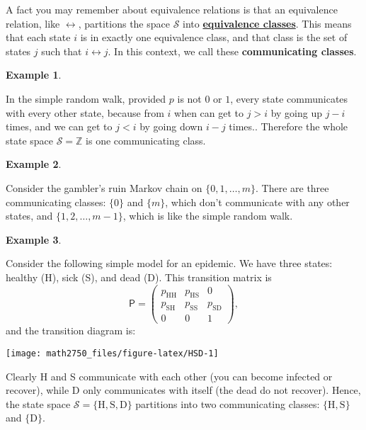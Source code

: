 \documentclass[
  a4paper,
]{article}
\theoremstyle{definition}
\theoremstyle{definition}
\newtheorem{example}{Example}[section]
\theoremstyle{definition}
\theoremstyle{remark}
\begin{document}
A fact you may remember about equivalence relations is that an equivalence relation, like \(\leftrightarrow\), partitions the space \(\mathcal S\) into \href{https://en.wikipedia.org/wiki/Equivalence_class}{\textbf{equivalence classes}}. This means that each state \(i\) is in exactly one equivalence class, and that class is the set of states \(j\) such that \(i \leftrightarrow j\). In this context, we call these \textbf{communicating classes}.

\begin{example}
\protect\hypertarget{exm:rw-class}{}\label{exm:rw-class}

In the simple random walk, provided \(p\) is not \(0\) or \(1\), every state communicates with every other state, because from \(i\) when can get to \(j > i\) by going up \(j - i\) times, and we can get to \(j < i\) by going down \(i - j\) times.. Therefore the whole state space \(\mathcal S = \mathbb Z\) is one communicating class.

\end{example}

\begin{example}
\protect\hypertarget{exm:gamblers-class}{}\label{exm:gamblers-class}

Consider the gambler's ruin Markov chain on \(\{0,1,\dots,m\}\). There are three communicating classes: \(\{0\}\) and \(\{m\}\), which don't communicate with any other states, and \(\{1,2,\dots,m-1\}\), which is like the simple random walk.

\end{example}

\begin{example}
\protect\hypertarget{exm:hsd-class}{}\label{exm:hsd-class}

Consider the following simple model for an epidemic. We have three states: healthy (H), sick (S), and dead (D). This transition matrix is
\[ \mathsf P = \begin{pmatrix} p_{\mathrm{HH}} & p_{\mathrm{HS}} & 0 \\
p_{\mathrm{SH}} & p_{\mathrm{SS}} & p_{\mathrm{SD}} \\ 0 & 0 & 1 \end{pmatrix} ,    \]
and the transition diagram is:

\begin{center}\texttt{[image: math2750\_files/figure-latex/HSD-1]} \end{center}

Clearly H and S communicate with each other (you can become infected or recover), while D only communicates with itself (the dead do not recover). Hence, the state space \(\mathcal S = \{\mathrm{H},\mathrm{S},\mathrm{D}\}\) partitions into two communicating classes: \(\{\mathrm{H},\mathrm{S}\}\) and \(\{\mathrm{D}\}\).

\end{example}
\end{document}
